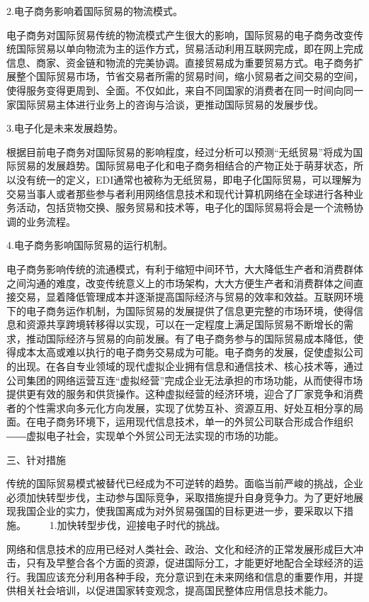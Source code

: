 2.电子商务影响着国际贸易的物流模式。

电子商务对国际贸易传统的物流模式产生很大的影响，国际贸易的电子商务改变传统国际贸易以单向物流为主的运作方式，贸易活动利用互联网完成，即在网上完成信息、商家、资金链和物流的完美协调。直接贸易成为重要贸易方式。电子商务扩展整个国际贸易市场，节省交易者所需的贸易时间，缩小贸易者之间交易的空间，使得服务变得更周到、全面。不仅如此，来自不同国家的消费者在同一时间向同一家国际贸易主体进行业务上的咨询与洽谈，更推动国际贸易的发展步伐。

3.电子化是未来发展趋势。

根据目前电子商务对国际贸易的影响程度，经过分析可以预测“无纸贸易”将成为国际贸易的发展趋势。国际贸易电子化和电子商务相结合的产物正处于萌芽状态，所以没有统一的定义，EDI通常也被称为无纸贸易，即电子化国际贸易，可以理解为交易当事人或者那些参与者利用网络信息技术和现代计算机网络在全球进行各种业务活动，包括货物交换、服务贸易和技术等，电子化的国际贸易将会是一个流畅协调的业务流程。

4.电子商务影响国际贸易的运行机制。

电子商务影响传统的流通模式，有利于缩短中间环节，大大降低生产者和消费群体之间沟通的难度，改变传统意义上的市场架构，大大方便生产者和消费群体之间直接交易，显着降低管理成本并逐渐提高国际经济与贸易的效率和效益。互联网环境下的电子商务运作机制，为国际贸易的发展提供了信息更完整的市场环境，使得信息和资源共享跨境转移得以实现，可以在一定程度上满足国际贸易不断增长的需求，推动国际经济与贸易的向前发展。有了电子商务参与的国际贸易成本降低，使得成本太高或难以执行的电子商务交易成为可能。电子商务的发展，促使虚拟公司的出现。在各自专业领域的现代虚拟企业拥有信息和通信技术、核心技术等，通过公司集团的网络运营互连“虚拟经营”完成企业无法承担的市场功能，从而使得市场提供更有效的服务和供货操作。这种虚拟经营的经济环境，迎合了厂家竞争和消费者的个性需求向多元化方向发展，实现了优势互补、资源互用、好处互相分享的局面。在电子商务环境下，运用现代信息技术，单一的外贸公司联合形成合作组织――虚拟电子社会，实现单个外贸公司无法实现的市场的功能。

三、针对措施

传统的国际贸易模式被替代已经成为不可逆转的趋势。面临当前严峻的挑战，企业必须加快转型步伐，主动参与国际竞争，采取措施提升自身竞争力。为了更好地展现我国企业的实力，使我国离成为对外贸易强国的目标更进一步，要采取以下措施。 　　1.加快转型步伐，迎接电子时代的挑战。

网络和信息技术的应用已经对人类社会、政治、文化和经济的正常发展形成巨大冲击，只有及早整合各个方面的资源，促进国际分工，才能更好地配合全球经济的运行。我国应该充分利用各种手段，充分意识到在未来网络和信息的重要作用，并提供相关社会培训，以促进国家转变观念，提高国民整体应用信息技术能力。

